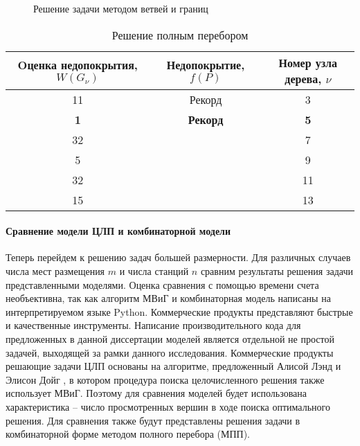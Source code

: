 \begin{figure}[ht]
  \caption{Решение задачи методом ветвей и границ}\label{fig:part2_branch_and_bound_tree}
\end{figure}

\begin{table}[h!]\centering
  \begin{tabular}{|c|c|c|}\hline
      
      Oценка недопокрытия, $W(G_\nu)$ & Недопокрытие, $f(P)$ & Номер узла дерева, $\nu$\\
      \hline
      11 & Рекорд & 3\\
      \textbf{1} & \textbf{Рекорд} & \textbf{5}\\
      32 &  & 7\\
      5 &  & 9\\
      32 &  & 11\\
      15 &  & 13\\
      \hline

\end{tabular}\caption{Решение полным перебором}\label{tab:branch_and_bound_solution}
\end{table}


\paragraph{Сравнение модели ЦЛП и комбинаторной модели}

Теперь перейдем к решению задач большей размерности. Для различных случаев числа мест размещения $m$ и числа станций $n$ сравним результаты решения задачи представленными моделями. Оценка сравнения с помощью времени счета необъективна, так как алгоритм МВиГ и комбинаторная модель написаны на интерпретируемом языке Python. Коммерческие продукты представляют быстрые и качественные инструменты. Написание производительного кода для предложенных в данной диссертации моделей является отдельной не простой задачей, выходящей за рамки данного исследования. Коммерческие продукты решающие задачи ЦЛП основаны на алгоритме, предложенный Алисой Лэнд и Элисон Дойг \cite{Land1960}, в котором процедура поиска целочисленного решения также использует МВиГ.  Поэтому для сравнения моделей будет использована характеристика -- число просмотренных вершин в ходе поиска оптимального решения. Для сравнения также будут представлены решения задачи в комбинаторной форме методом полного перебора (МПП).

